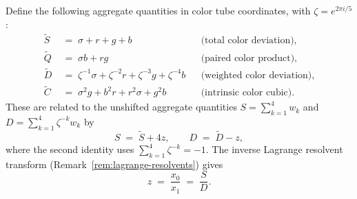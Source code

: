 \begin{remark}
\label{rem:aggregate-color-quantities}
  Define the following aggregate quantities in color tube coordinates,
  with $\zeta = e^{2\pi i/5}$:
  \begin{align}
    \widetilde{S} &\;=\; \sigma + r + g + b
      &&\text{(total color deviation),}
      \label{eq:agg-S-tilde}\\[4pt]
    \widetilde{Q} &\;=\; \sigma b + r g
      &&\text{(paired color product),}
      \label{eq:agg-Q-tilde}\\[4pt]
    \widetilde{D} &\;=\; \zeta^{-1}\sigma + \zeta^{-2}r + \zeta^{-3}g + \zeta^{-4}b
      &&\text{(weighted color deviation),}
      \label{eq:agg-D-tilde}\\[4pt]
    \widetilde{C} &\;=\; \sigma^2 g + b^2 r + r^2\sigma + g^2 b
      &&\text{(intrinsic color cubic).}
      \label{eq:agg-C-tilde}
  \end{align}
  These are related to the unshifted aggregate quantities
  $S = \sum_{k=1}^{4}w_k$ and $D = \sum_{k=1}^{4}\zeta^{-k}w_k$ by
  \begin{equation}\label{eq:aggregate-shift}
    S \;=\; \widetilde{S} + 4z, \qquad D \;=\; \widetilde{D} - z,
  \end{equation}
  where the second identity uses $\sum_{k=1}^{4}\zeta^{-k} = -1$.
  The inverse Lagrange resolvent transform
  (Remark~\ref{rem:lagrange-resolvents}) gives
  \begin{equation}\label{eq:z-from-SD}
    z \;=\; \frac{x_0}{x_1} \;=\; \frac{S}{D}.
  \end{equation}
\end{remark}

